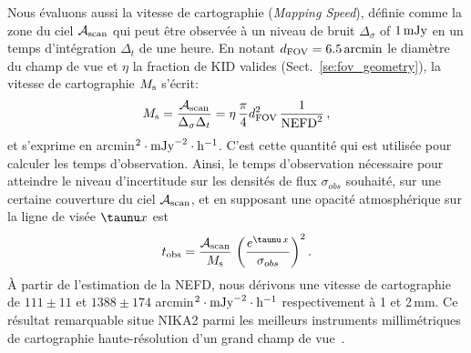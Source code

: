 Nous évaluons aussi la vitesse de cartographie (\emph{Mapping Speed}), 
définie comme la zone du ciel $\mathcal{A}_{\rm{scan}}$ qui peut être
observée à un niveau de bruit $\Delta_\sigma$ of $1\,\rm{mJy}$ en un
temps d'intégration $\Delta_t$ de une heure. En notant $d_{\rm{FOV}} =
6.5\,\rm{arcmin}$ le diamètre du champ de vue et $\eta$ la fraction de
KID valides (Sect.~\ref{se:fov_geometry}), la vitesse de cartographie
$M_{\rm{s}}$ s'écrit: 
\begin{equation}
M_{\rm{s}} = \frac{\mathcal{A}_{\rm{scan}}}{\Delta_\sigma\Delta_t} = 
\eta \, \frac{\pi}{4} d_{\rm{FOV}}^2 \, \frac{1}{\rm{NEFD}^2}\, ,
\label{eq:mapping_speed}
\end{equation}
et s'exprime en arcmin$^2 \cdot \rm{mJy}^{-2} \cdot
\rm{h}^{-1}$. C'est cette quantité qui est utilisée pour calculer
les temps d'observation. Ainsi, le temps d'observation nécessaire pour
atteindre le niveau d'incertitude sur les densités de flux
$\sigma_{obs}$ souhaité, sur une certaine couverture du ciel
$\mathcal{A}_{\rm{scan}}$, et en supposant une opacité atmosphérique
  sur la ligne de visée $\taunu x$ est
\begin{equation}
  t_{\rm{obs}} = \frac{\mathcal{A}_{\rm{scan}}}{ M_{\rm{s}}} \, \left(\frac{e^{\taunu\, x}}{\sigma_{obs}}\right)^2.
\end{equation}
\`A partir de l'estimation de la NEFD, nous dérivons une vitesse de
cartographie de $111 \pm 11$ et $1388 \pm 174$ arcmin$^2 \cdot
\rm{mJy}^{-2} \cdot \rm{h}^{-1}$ respectivement à 1 et
2\,mm. Ce résultat remarquable situe NIKA2 parmi les meilleurs
instruments millimétriques de cartographie haute-résolution d'un grand
champ de vue~\citep{Tony2019}.

